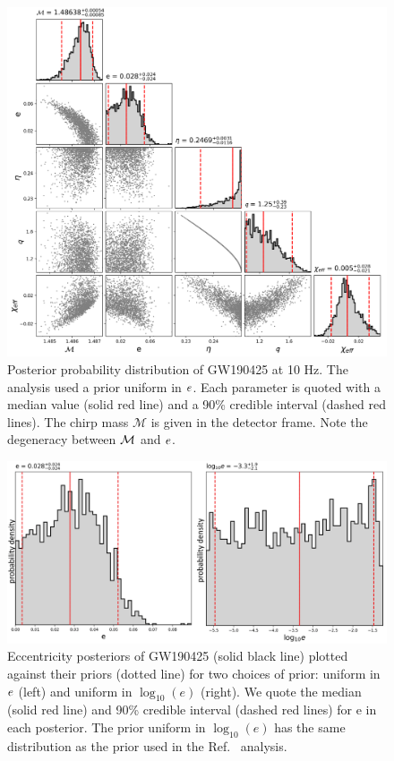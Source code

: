 \begin{figure}[p]
    \includegraphics[width=\textwidth]{Figures/bns-pe/GW190425-e10.png}
    \caption{Posterior probability distribution of GW190425 at 10 Hz. The analysis used a prior uniform in $e$. Each parameter is quoted with a median value (solid red line) and a 90\% credible interval (dashed red lines). The chirp mass $\mathcal{M}$ is given in the detector frame. Note the degeneracy between $\mathcal{M}$ and $e$.}
\label{Fig:GW190425}
\end{figure}

\begin{figure}[p]
    \includegraphics[width=\textwidth]{Figures/bns-pe/1Dmarginal-eccen-10hz.png}
    \caption{Eccentricity posteriors of GW190425 (solid black line) plotted against their priors (dotted line) for two choices of prior: uniform in $e$ (left) and uniform in $\log_{10}(e)$ (right). We quote the median (solid red line) and 90\% credible interval (dashed red lines) for e in each posterior. The prior uniform in $\log_{10}(e)$ has the same distribution as the prior used in the Ref.~\protect\cite{Romero-Shaw:2020aaj} analysis.}
    \label{Fig:1DMarginal}
\end{figure}